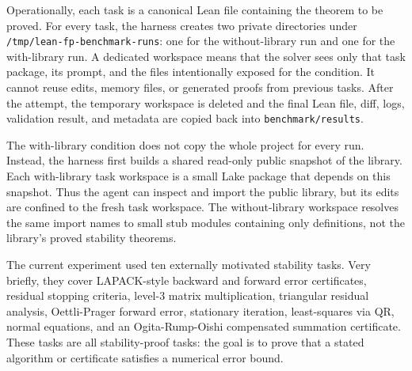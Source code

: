 \documentclass[10pt]{article}
\begin{document}
Operationally, each task is a canonical Lean file containing the theorem to be
proved.  For every task, the harness creates two private directories under
\texttt{/tmp/lean-fp-benchmark-runs}: one for the without-library run and one
for the with-library run.  A dedicated workspace means that the solver sees
only that task package, its prompt, and the files intentionally exposed for the
condition.  It cannot reuse edits, memory files, or generated proofs from
previous tasks.  After the attempt, the temporary workspace is deleted and the
final Lean file, diff, logs, validation result, and metadata are copied back
into \texttt{benchmark/results}.

The with-library condition does not copy the whole project for every run.
Instead, the harness first builds a shared read-only public snapshot of the
library.  Each with-library task workspace is a small Lake package that depends
on this snapshot.  Thus the agent can inspect and import the public library,
but its edits are confined to the fresh task workspace.  The without-library
workspace resolves the same import names to small stub modules containing only
definitions, not the library's proved stability theorems.

The current experiment used ten externally motivated stability tasks.  Very
briefly, they cover LAPACK-style backward and forward error certificates,
residual stopping criteria, level-3 matrix multiplication, triangular residual
analysis, Oettli-Prager forward error, stationary iteration, least-squares via
QR, normal equations, and an Ogita-Rump-Oishi compensated summation
certificate.  These tasks are all stability-proof tasks: the goal is to prove
that a stated algorithm or certificate satisfies a numerical error bound.
\end{document}
